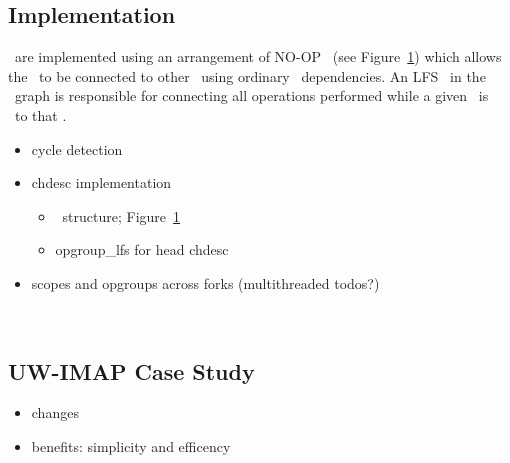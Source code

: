 \subsection{Implementation}
\label{sec:opgroup:implementation}


\Opgroups\ are implemented using an arrangement of NO-OP \chdescs\ (see
Figure~\ref{fig:opgroup-chdescs}) which allows the \opgroup\ to be connected to
other \opgroups\ using ordinary \chdesc\ dependencies. An LFS \module\ in the
\module\ graph is responsible for connecting all operations performed while a
given \opgroup\ is \engaged\ to that \opgroup.

\begin{itemize}
\item cycle detection
\item chdesc implementation
  \begin{itemize}
  \item \chdesc\ structure; Figure~\ref{fig:opgroup-chdescs}
  \item opgroup\_lfs for head chdesc
  \end{itemize}
\item scopes and opgroups across forks (multithreaded todos?)
\end{itemize}

\begin{figure}[htb]
\caption{\label{fig:opgroup-chdescs} \Opgroup\ \Chdescs}
\end{figure}

\subsection{UW-IMAP Case Study}
\label{sec:opgroup:uwimap}
\begin{itemize}
\item changes
\item benefits: simplicity and efficency
\end{itemize}
